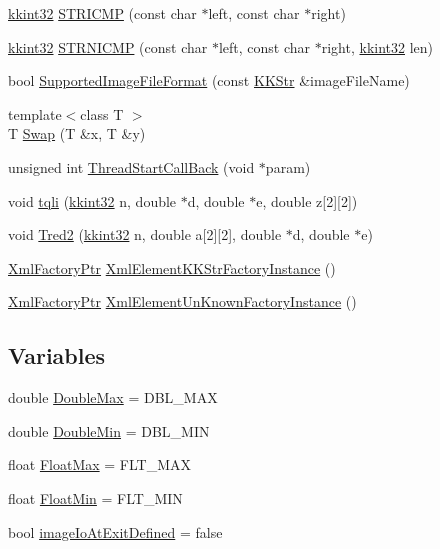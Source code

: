 \begin{DoxyCompactItemize}
\hyperlink{namespace_k_k_b_a8fa4952cc84fda1de4bec1fbdd8d5b1b}{kkint32} \hyperlink{namespace_k_k_b_a94c71ca99ba76f5e731e9851ccd7d518}{S\+T\+R\+I\+C\+MP} (const char $\ast$left, const char $\ast$right)
\item 
\hyperlink{namespace_k_k_b_a8fa4952cc84fda1de4bec1fbdd8d5b1b}{kkint32} \hyperlink{namespace_k_k_b_aa068d67352827e603547d10c12596c97}{S\+T\+R\+N\+I\+C\+MP} (const char $\ast$left, const char $\ast$right, \hyperlink{namespace_k_k_b_a8fa4952cc84fda1de4bec1fbdd8d5b1b}{kkint32} len)
\item 
bool \hyperlink{namespace_k_k_b_a8cc2b9d78aae6ffccb1d2c625f471f90}{Supported\+Image\+File\+Format} (const \hyperlink{class_k_k_b_1_1_k_k_str}{K\+K\+Str} \&image\+File\+Name)
\item 
{\footnotesize template$<$class T $>$ }\\T \hyperlink{namespace_k_k_b_aa407f810727f686de25d56fec45a9372}{Swap} (T \&x, T \&y)
\item 
unsigned int \hyperlink{namespace_k_k_b_ae794a520ad588629dcd5827773f4ff86}{Thread\+Start\+Call\+Back} (void $\ast$param)
\item 
void \hyperlink{namespace_k_k_b_af61d1354a68af3f797ed471b1cc3ff8f}{tqli} (\hyperlink{namespace_k_k_b_a8fa4952cc84fda1de4bec1fbdd8d5b1b}{kkint32} n, double $\ast$d, double $\ast$e, double z\mbox{[}2\mbox{]}\mbox{[}2\mbox{]})
\item 
void \hyperlink{namespace_k_k_b_a2a2800ef0c9757025d696bcd2fb289b8}{Tred2} (\hyperlink{namespace_k_k_b_a8fa4952cc84fda1de4bec1fbdd8d5b1b}{kkint32} n, double a\mbox{[}2\mbox{]}\mbox{[}2\mbox{]}, double $\ast$d, double $\ast$e)
\item 
\hyperlink{namespace_k_k_b_a39be21bf55480cb360e2fd785ad60af1}{Xml\+Factory\+Ptr} \hyperlink{namespace_k_k_b_a88b0e80460176ad8709788bb614129b7}{Xml\+Element\+K\+K\+Str\+Factory\+Instance} ()
\item 
\hyperlink{namespace_k_k_b_a39be21bf55480cb360e2fd785ad60af1}{Xml\+Factory\+Ptr} \hyperlink{namespace_k_k_b_a064ced683cbf54b5cc186bdadd9bda14}{Xml\+Element\+Un\+Known\+Factory\+Instance} ()
\end{DoxyCompactItemize}
\subsection*{Variables}
\begin{DoxyCompactItemize}
\item 
double \hyperlink{namespace_k_k_b_ad44c1392d19990e1279f4bd560df285d}{Double\+Max} = D\+B\+L\+\_\+\+M\+AX
\item 
double \hyperlink{namespace_k_k_b_ac986478abc5917bf650913249e2f457b}{Double\+Min} = D\+B\+L\+\_\+\+M\+IN
\item 
float \hyperlink{namespace_k_k_b_ae17198c2bfe6bff1db2be8bb83f51929}{Float\+Max} = F\+L\+T\+\_\+\+M\+AX
\item 
float \hyperlink{namespace_k_k_b_ab02e2be56dc2602d9fe757f5261ebc4c}{Float\+Min} = F\+L\+T\+\_\+\+M\+IN
\item 
bool \hyperlink{namespace_k_k_b_a5623f4480489ffc80054153dff49013d}{image\+Io\+At\+Exit\+Defined} = false
\end{DoxyCompactItemize}


